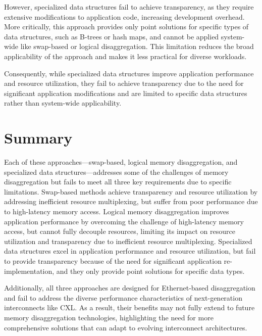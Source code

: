 However, specialized data structures fail to achieve transparency, as they require extensive modifications to application code, increasing development overhead. More critically, this approach provides only point solutions for specific types of data structures, such as B-trees or hash maps, and cannot be applied system-wide like swap-based or logical disaggregation. This limitation reduces the broad applicability of the approach and makes it less practical for diverse workloads.

Consequently, while specialized data structures improve application performance and resource utilization, they fail to achieve transparency due to the need for significant application modifications and are limited to specific data structures rather than system-wide applicability.

\section{Summary}

Each of these approaches—swap-based, logical memory disaggregation, and specialized data structures—addresses some of the challenges of memory disaggregation but fails to meet all three key requirements due to specific limitations. Swap-based methods achieve transparency and resource utilization by addressing inefficient resource multiplexing, but suffer from poor performance due to high-latency memory access. Logical memory disaggregation improves application performance by overcoming the challenge of high-latency memory access, but cannot fully decouple resources, limiting its impact on resource utilization and transparency due to inefficient resource multiplexing. Specialized data structures excel in application performance and resource utilization, but fail to provide transparency because of the need for significant application re-implementation, and they only provide point solutions for specific data types.

Additionally, all three approaches are designed for Ethernet-based disaggregation and fail to address the diverse performance characteristics of next-generation interconnects like CXL. As a result, their benefits may not fully extend to future memory disaggregation technologies, highlighting the need for more comprehensive solutions that can adapt to evolving interconnect architectures.




